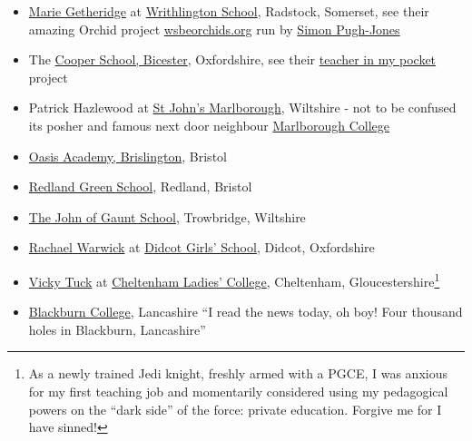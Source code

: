 \documentclass[
]{book}
\providecommand{\tightlist}{%
  \setlength{\itemsep}{0pt}\setlength{\parskip}{0pt}}
\begin{document}
\begin{itemize}
\tightlist
\item
  \href{https://wessexlearningtrust.co.uk/teammembers/marie-getheridge/}{Marie Getheridge} at \href{https://en.wikipedia.org/wiki/Writhlington_School}{Writhlington School}, Radstock, Somerset, see their amazing Orchid project \href{https://wsbeorchids.org/thirty-years-of-the-writhlington-schools-orchid-project-a-teachers-view-by-simon-pugh-jones/}{wsbeorchids.org} run by \href{https://www.bristol.ac.uk/graduation/honorary-degrees/honorary-graduates-2019/simon-pugh-jones/}{Simon Pugh-Jones}
\item
  The \href{https://en.wikipedia.org/wiki/Cooper_School,_Bicester}{Cooper School, Bicester}, Oxfordshire, see their \href{https://www.youtube.com/watch?v=XdywHl2ZA-I}{teacher in my pocket} project
\item
  Patrick Hazlewood at \href{https://en.wikipedia.org/wiki/St_John\%27s_Marlborough}{St John's Marlborough}, Wiltshire - not to be confused its posher and famous next door neighbour \href{https://en.wikipedia.org/wiki/Marlborough_College}{Marlborough College}
\item
  \href{https://en.wikipedia.org/wiki/Oasis_Academy_Brislington}{Oasis Academy, Brislington}, Bristol
\item
  \href{https://en.wikipedia.org/wiki/Redland_Green_School}{Redland Green School}, Redland, Bristol
\item
  \href{https://en.wikipedia.org/wiki/The_John_of_Gaunt_School}{The John of Gaunt School}, Trowbridge, Wiltshire
\item
  \href{https://twitter.com/rachaelwarwick7}{Rachael Warwick} at \href{https://en.wikipedia.org/wiki/Didcot_Girls\%27_School}{Didcot Girls' School}, Didcot, Oxfordshire
\item
  \href{http://news.bbc.co.uk/local/gloucestershire/hi/people_and_places/newsid_8741000/8741279.stm}{Vicky Tuck} at \href{https://en.wikipedia.org/wiki/Cheltenham_Ladies\%27_College}{Cheltenham Ladies' College}, Cheltenham, Gloucestershire\footnote{As a newly trained Jedi knight, freshly armed with a PGCE, I was anxious for my first teaching job and momentarily considered using my pedagogical powers on the ``dark side'' of the force: private education. \citep{nicebutdim} Forgive me for I have sinned!} \citep{cheltenham}
\item
  \href{https://en.wikipedia.org/wiki/Blackburn_College,_Lancashire}{Blackburn College}, Lancashire ``I read the news today, oh boy! Four thousand holes in Blackburn, Lancashire'' \citep{adayinthelife}
\end{itemize}
\end{document}
